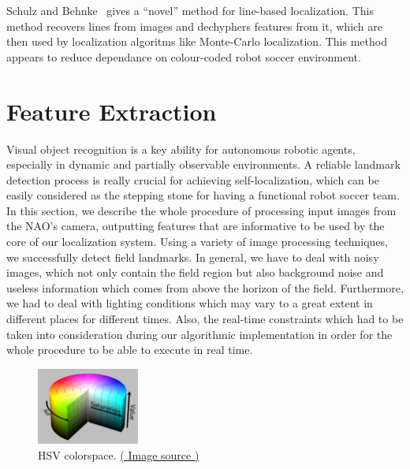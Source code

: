 \documentclass[	DIV=calc,%
							paper=a4,%
							fontsize=9pt,%
							twocolumn]{scrartcl}	 					%
\begin{document}
Schulz and Behnke~\cite{schulz2012utilizing} gives a ``novel'' method for line-based localization. This method recovers lines from images and dechyphers features from it, which are then used by localization algoritms like Monte-Carlo localization. This method appears to reduce dependance on colour-coded robot soccer environment.

\section{Feature Extraction}
\label{sec:FeatureExtraction}
Visual object recognition is a key ability for autonomous robotic agents, especially in dynamic and partially observable environments. A reliable landmark detection process is really crucial for achieving self-localization, which can be easily considered as the stepping stone for having a functional robot soccer team. In this section, we describe the whole procedure of processing input images from the NAO's camera, outputting features that are informative to be used by the core of our localization system.  Using a variety of image processing techniques, we successfully detect field landmarks. In general, we have to deal with noisy images, which not only contain the field region but also background noise and useless information which comes from above the horizon of the field. Furthermore, we had to deal with lighting conditions which may vary to a great extent in different places for different times. Also, the real-time constraints which had to be taken into consideration during our algorithmic implementation in order for the whole procedure to be able to execute in real time.

\begin{figure}[t!]
  \caption{HSV colorspace. \href{http://en.wikipedia.org/wiki/HSL_and_HSV}{( Image source )}}
  \label{hsv}
  \centering
    \includegraphics[width=0.3\textwidth]{figures/1280px-HSV_color_solid_cylinder_alpha_lowgamma.png}
\end{figure}
\end{document}
